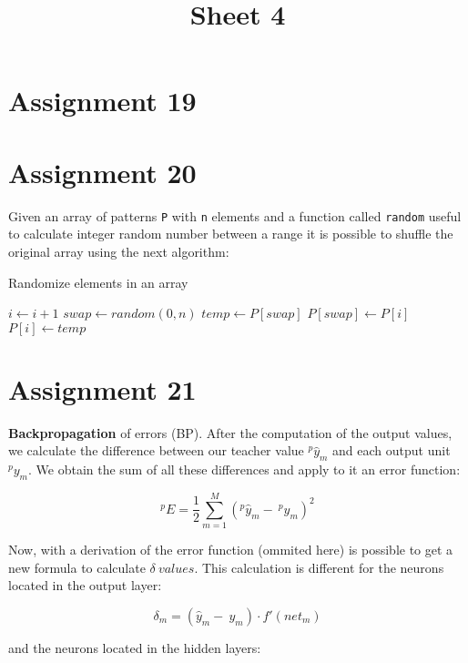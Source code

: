 \documentclass[12pt]{article}
\begin{document}
 
\title{Sheet 4} 
\maketitle
 
\section{Assignment 19}

\section{Assignment 20}

Given an array of patterns \texttt{P} with \texttt{n} elements and a function called
\texttt{random} useful to calculate integer random number between a range it is
possible to shuffle the original array using the next algorithm:

\begin{algorithm}
\caption*{Randomize elements in an array}
    \begin{algorithmic}[1]
            \State $i\gets i + 1$
            \State $swap\gets random(0, n)$
            \State $temp\gets P[swap]$
            \State $P[swap]\gets P[i]$
            \State $P[i]\gets temp$
        \EndFor
    \end{algorithmic}
\end{algorithm}

\section{Assignment 21}

\textbf{Backpropagation} of errors (BP). After the computation of the output
values, we calculate the difference between our teacher value
$^{p}{\hat{y}}_{m}$ and each output unit $^{p}y_{m}$. We obtain the sum of all
these differences and apply to it an error function:

$$ ^{p}E = \frac{1}{2} \sum_{m=1}^{M} (^{p}{\hat{y}}_{m} -\: ^{p}y_{m})^2 $$

Now, with a derivation of the error function (ommited here) is possible to get
a new formula to calculate $\delta\: values$. This calculation is different for
the neurons located in the output layer: 

$$\delta_{m} = ( \hat{y}_{m} -\: y_{m}) \cdot f'(net_{m})$$

and the neurons located in the hidden layers: 
\end{document}
